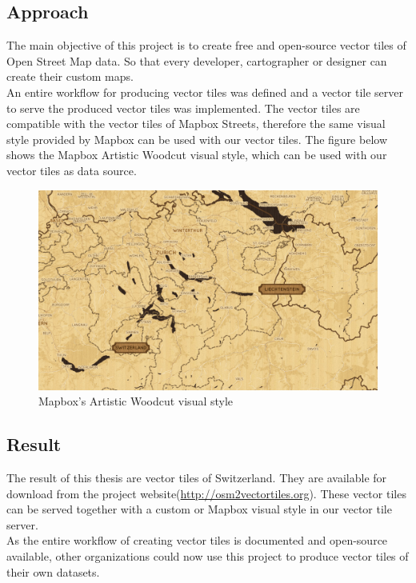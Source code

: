 \subsection*{Approach}

The main objective of this project is to create free and open-source vector tiles of Open Street Map data. So that every developer, cartographer or designer can create their custom maps.\\ 
An entire workflow for producing vector tiles was defined and a vector tile server to serve the produced vector tiles was implemented. The vector tiles are compatible with the vector tiles of Mapbox Streets, therefore the same visual style provided by Mapbox can be used with our vector tiles. The figure below shows the Mapbox Artistic Woodcut visual style, which can be used with our vector tiles as data source.

\begin{figure}[H]
  \includegraphics[width=1\textwidth]{images/woodcut.png}
  \caption{Mapbox's Artistic Woodcut visual style}
\end{figure}


\subsection*{Result}
The result of this thesis are vector tiles of Switzerland. They are available for download from the project website(\url{http://osm2vectortiles.org}). These vector tiles can be served together with a custom or Mapbox visual style in our vector tile server.\\
As the entire workflow of creating vector tiles is documented and open-source available, other organizations could now use this project to produce vector tiles of their own datasets.
\endgroup

\vfill
